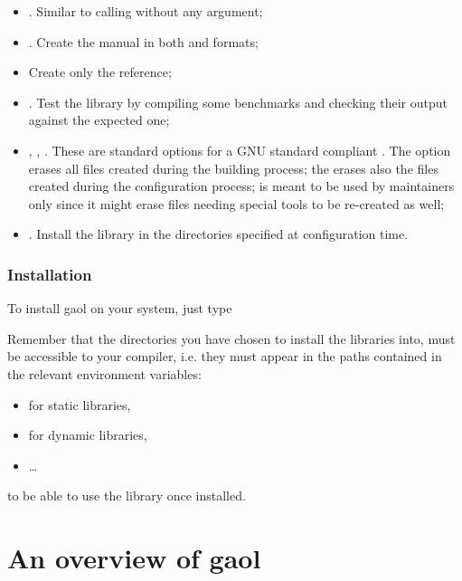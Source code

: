 \documentclass{manual}
\begin{document}
\begin{itemize}
\item {}. Similar to calling  without any
  argument;
\item {}. Create the manual in both  and
   formats;
\item {} Create only the  reference;
\item {}. Test the library by compiling some benchmarks and
  checking their output against the expected one;
\item {}, ,
  . These are standard options for a GNU standard
  compliant . The  option erases all files
  created during the building process; the  erases also
  the files created during the configuration process;
   is meant to be used by maintainers only since
  it might erase files needing special tools to be re-created as well;
\item {}. Install the library in the directories specified
  at configuration time.
\end{itemize}


\subsection{Installation}
To install gaol on your system, just type

\begin{cmdshell}
\end{cmdshell}

Remember that the directories you have chosen to install the libraries
into, must be accessible to your compiler, i.e. they must appear in
the paths contained in the relevant environment variables:
\begin{itemize}
\item {} for static libraries,
\item {} for dynamic libraries,
\item \ldots
\end{itemize}
to be able to use the library once installed.
%


\chapter{An overview of gaol}
\end{document}

